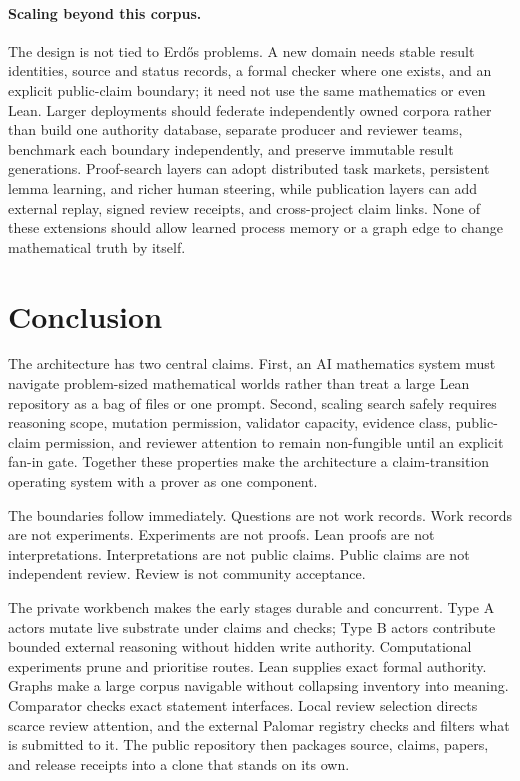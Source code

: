 \documentclass[10pt]{article}
\begin{document}
\paragraph{Scaling beyond this corpus.}
The design is not tied to Erd\H{o}s problems. A new domain needs stable result
identities, source and status records, a formal checker where one exists, and
an explicit public-claim boundary; it need not use the same mathematics or
even Lean. Larger deployments should federate independently owned corpora
rather than build one authority database, separate producer and reviewer
teams, benchmark each boundary independently, and preserve immutable result
generations. Proof-search layers can adopt distributed task markets,
persistent lemma learning, and richer human steering, while publication layers
can add external replay, signed review receipts, and cross-project claim
links. None of these extensions should allow learned process memory or a graph
edge to change mathematical truth by itself.
\normalsize

\section{Conclusion}\label{sec:conclusion}

The architecture has two central claims. First, an AI mathematics system must
navigate problem-sized mathematical worlds rather than treat a large Lean
repository as a bag of files or one prompt. Second, scaling search safely
requires reasoning scope, mutation permission, validator capacity, evidence
class, public-claim permission, and reviewer attention to remain non-fungible
until an explicit fan-in gate. Together these properties make the architecture
a claim-transition operating system with a prover as one component.

The boundaries follow immediately. Questions are not work records. Work
records are not experiments. Experiments are not proofs. Lean proofs are not
interpretations. Interpretations are not public claims. Public claims are not
independent review. Review is not community acceptance.

The private workbench makes the early stages durable and concurrent. Type A
actors mutate live substrate under claims and checks; Type B actors contribute
bounded external reasoning without hidden write authority. Computational
experiments prune and prioritise routes. Lean supplies exact formal authority.
Graphs make a large corpus navigable without collapsing inventory into meaning.
Comparator checks exact statement interfaces. Local review selection directs
scarce review attention, and the external Palomar registry checks and filters
what is submitted to it. The public repository then packages source, claims, papers, and
release receipts into a clone that stands on its own.
\end{document}
